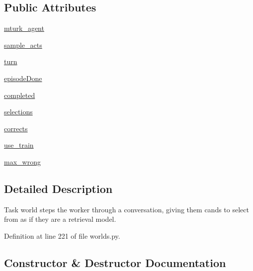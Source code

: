 \subsection*{Public Attributes}
\begin{DoxyCompactItemize}
\item 
\hyperlink{classlight__chat__eval_1_1worlds_1_1LightEvalTaskWorld_ac8f15206b335ec5ea3498a3ee1b0f65f}{mturk\+\_\+agent}
\item 
\hyperlink{classlight__chat__eval_1_1worlds_1_1LightEvalTaskWorld_a60c0b70ca0cfb7d35c2b0eac85df0cf1}{sample\+\_\+acts}
\item 
\hyperlink{classlight__chat__eval_1_1worlds_1_1LightEvalTaskWorld_a54478e731c75aaf71048894bb762a005}{turn}
\item 
\hyperlink{classlight__chat__eval_1_1worlds_1_1LightEvalTaskWorld_ab0ffce12733c1c46f5dc64b1a802f1e2}{episode\+Done}
\item 
\hyperlink{classlight__chat__eval_1_1worlds_1_1LightEvalTaskWorld_a1deec2abb5e96799ec49097721586013}{completed}
\item 
\hyperlink{classlight__chat__eval_1_1worlds_1_1LightEvalTaskWorld_a9dac942996f55099107ba813e91ce437}{selections}
\item 
\hyperlink{classlight__chat__eval_1_1worlds_1_1LightEvalTaskWorld_a89359a6fdc961c97b5859980b3790540}{corrects}
\item 
\hyperlink{classlight__chat__eval_1_1worlds_1_1LightEvalTaskWorld_ad605071600d13b139e24541051eb4afb}{use\+\_\+train}
\item 
\hyperlink{classlight__chat__eval_1_1worlds_1_1LightEvalTaskWorld_a272355df766ac2722a7547deb5755651}{max\+\_\+wrong}
\end{DoxyCompactItemize}


\subsection{Detailed Description}
\begin{DoxyVerb}Task world steps the worker through a conversation, giving them cands to select from
as if they are a retrieval model.
\end{DoxyVerb}
 

Definition at line 221 of file worlds.\+py.



\subsection{Constructor \& Destructor Documentation}
\mbox{\label{classlight__chat__eval_1_1worlds_1_1LightEvalTaskWorld_a9f9e7de884af532dc436e72c8c0011fc}} 
